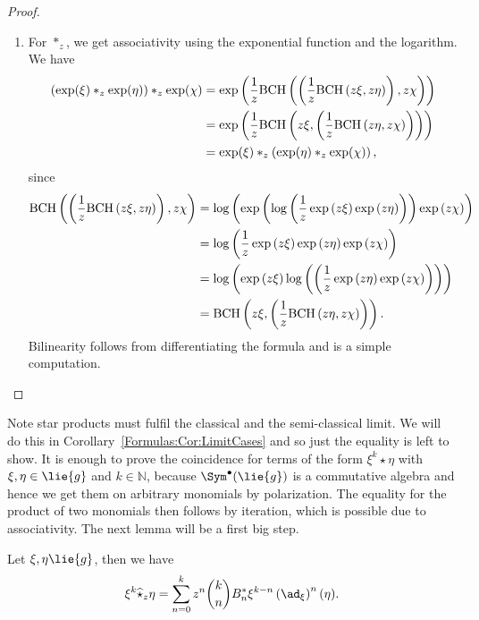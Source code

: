 \begin{proof}
\begin{enumerate}
	\item
	For $\ast_z$, we get associativity using the exponential function and the 
	logarithm. We have
	\begin{align*}
		\left( 
			\exp(\xi) \ast_z \exp(\eta) 
		\right) 
		\ast_z \exp(\chi)
		&=
		\exp
		\left(
			\frac{1}{z}
			\mathrm{BCH}\left(
				\left(
					\frac{1}{z}
					\mathrm{BCH}\left(z \xi, z \eta\right)
				\right)
			, z \chi\right)
		\right)
		\\
		&=
		\exp
		\left(
			\frac{1}{z}
			\mathrm{BCH}\left(z \xi, 
				\left(
					\frac{1}{z}
					\mathrm{BCH}\left(z \eta, z \chi\right)
				\right)
			\right)
		\right)
		\\
		&=
		\exp(\xi)
		\ast_z
		\left( 
			\exp(\eta) \ast_z \exp(\chi) 
		\right), 
	\end{align*}
	since
	\begin{align*}
	\mathrm{BCH}\left(
		\left(
			\frac{1}{z}
			\mathrm{BCH}\left(z \xi, z \eta\right)
		\right)
	, z \chi\right)
	& =
	\log\left(
		\exp\left(
			\log\left(
				\frac{1}{z}
				\exp\left(
					z \xi
				\right)
				\exp\left(
					z \eta
				\right)
			\right)
		\right)
		\exp\left(
			z \chi
		\right)
	\right)
	\\
	& =
	\log\left(
		\frac{1}{z}
		\exp\left(
			z \xi
		\right)
		\exp\left(
			z \eta
		\right)
		\exp\left(
			z \chi
		\right)
	\right)
	\\
	& =
	\log\left(
		\exp\left(
			z \xi
		\right)
		\log\left(
			\left(
				\frac{1}{z}
				\exp\left(
					z \eta
				\right)
				\exp\left(
					z \chi
				\right)
			\right)
		\right)
	\right)
	\\
	& =
	\mathrm{BCH}\left(z \xi, 
		\left(
			\frac{1}{z}
			\mathrm{BCH}\left(z \eta, z \chi\right)
		\right)
	\right).
	\end{align*}
	Bilinearity follows from differentiating the formula and is 
	a simple computation.
  \end{enumerate}	 
\end{proof}
Note star products must fulfil the classical and the semi-classical limit. 
We will do this in Corollary~\ref{Formulas:Cor:LimitCases} and so just the 
equality is left to show. It is enough to prove the coincidence for terms of 
the form $\xi^k \star \eta$ with $\xi, \eta \in \lie{g}$ and $k \in 
\mathbb{N}$, because $\Sym^{\bullet}(\lie{g})$ is a commutative algebra and 
hence we get them on arbitrary monomials by polarization. The equality for the 
product of two monomials then follows by iteration, which is possible due to 
associativity. The next lemma will be a first big step.
\begin{lemma}
	Let $\xi, \eta \lie{g}$, then we have
	\begin{equation}
		\label{Alg:GuttStarFormula}
		\xi^k \widehat{\star}_z \eta
		=
	 	\sum\limits_{n=0}^k 
	 	z^n \binom{k}{n} B_n^*
	 	\xi^{k-n} 
	 	\left( \ad_{\xi} \right)^n (\eta).
	\end{equation}
\end{lemma}
